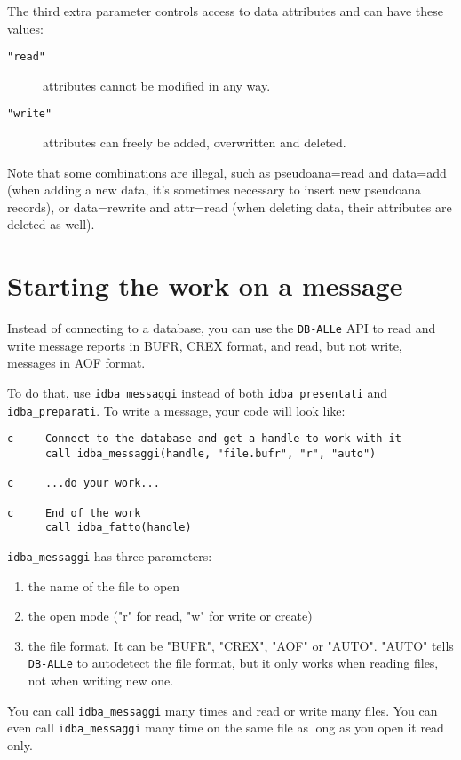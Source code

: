 \documentclass[final,12pt,a4paper,twoside]{book}
\newcommand{\dballe}{{\tt DB-ALLe}}
\begin{document}
The third extra parameter controls access to data attributes and can have
these values:

\begin{description}
\item[{\tt "read"}] attributes cannot be modified in any way.
\item[{\tt "write"}] attributes can freely be added, overwritten and deleted.
\end{description}

Note that some combinations are illegal, such as pseudoana=read and data=add
(when adding a new data, it's sometimes necessary to insert new pseudoana
records), or data=rewrite and attr=read (when deleting data, their attributes
are deleted as well).

\section{Starting the work on a message}

Instead of connecting to a database, you can use the \dballe{} API to read and
write message reports in BUFR, CREX format, and read, but not write, messages
in AOF format.

To do that, use {\tt idba\_messaggi} instead of both {\tt idba\_presentati} and
{\tt idba\_preparati}.  To write a message, your code will look like:

\begin{verbatim}
c     Connect to the database and get a handle to work with it
      call idba_messaggi(handle, "file.bufr", "r", "auto")

c     ...do your work...

c     End of the work
      call idba_fatto(handle)
\end{verbatim}

\label{fun-idba_messaggi}

{\tt idba\_messaggi} has three parameters:

\begin{enumerate}
\item the name of the file to open
\item the open mode ("r" for read, "w" for write or create)
\item the file format.  It can be "BUFR", "CREX", "AOF" or "AUTO".  "AUTO"
      tells \dballe{} to autodetect the file format, but it only works when
      reading files, not when writing new one.
\end{enumerate}

You can call {\tt idba\_messaggi} many times and read or write many files.  You
can even call {\tt idba\_messaggi} many time on the same file as long as you
open it read only.
\end{document}
